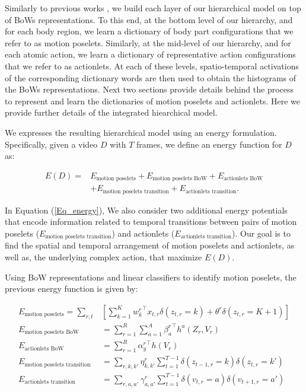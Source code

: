 Similarly to previous works \cite{Lillo2014, Taralova:EtAl:2014}, we build 
each layer of our hierarchical model on top of BoWs 
representations. To this end, at the bottom level of our hierarchy, and for 
each body region, we learn a dictionary of body part configurations that we 
refer to as motion poselets. Similarly, at the mid-level of our hierarchy, and 
for each atomic action, we learn a dictionary of representative action 
configurations that we refer to as actionlets. At each of these levels, 
spatio-temporal activations of the corresponding dictionary words are then used 
to obtain the histograms of the BoWs representations. Next two sections provide 
details behind the process to represent and learn the dictionaries of motion 
poselets and actionlets. Here we provide further details of the 
integrated hiearchical model.

We expresses the resulting hierarchical model using an energy formulation. 
Specifically, given a video $D$ with $T$ frames, we
define an energy function for $D$ as:

\begin{align}\label{Eq_energy}
E(D) = & E_{\text{motion poselets}} + E_{\text{motion poselets BoW}} + 
E_{\text{actionlets BoW}} \nonumber \\ 
& + E_{\text{motion poselets transition}} + E_{\text{actionlets 
transition}}.
\end{align}

In Equation (\ref{Eq_energy}), We 
also 
consider two additional energy potentials that encode information related to 
temporal 
transitions between pairs of motion poselets ($E_{\text{motion poselets 
transition}}$) and 
actionlets ($E_{\text{actionlets transition}}$). Our goal is to find the 
spatial and temporal arrangement 
of motion poselets and actionlets, as well as, the underlying 
complex action, that maximize $E(D)$. 

Using BoW representations and linear classifiers to identify motion poselets, 
the previous energy function is given by:

\small{
\begin{align}
E_{\text{motion poselets}}  =  \sum_{r,t} & \left[ \sum_{k=1}^K {w^r_k}^\top 
x_{t,r}\delta(z_{t,r} = k) + 
\theta^r \delta(z_{t,r}=K+1)\right] \\
E_{\text{motion poselets BoW}} & = \sum_{r=1}^R \sum_{a=1}^A {\beta^r_{a}}^\top 
h^{a}(Z_r,V_r) \\
E_{\text{actionlets BoW}} &=\sum_{r=1}^R {\alpha^r_{y}}^\top h(V_r) \\
E_{\text{motion poselets transition}} & = \sum_{r,k,k'} \eta^r_{k,k'} 
\sum_{t=1}^{T-1} 
\delta(z_{t-1,r}=k)\delta(z_{t,r}=k')\\
E_{\text{actionlets transition}} & =\sum_{r, a,a'} \gamma^r_{a,a'} 
\sum_{t=1}^{T-1} 
\delta(v_{t,r}=a)\delta(v_{t+1,r}=a') 
\end{align}
}


